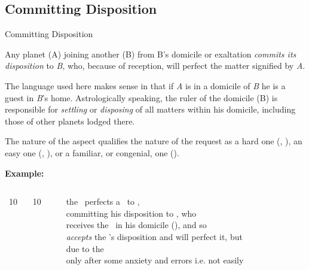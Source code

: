 \subsection{Committing Disposition}
\begin{frame}[t]{Committing Disposition}
\small
\begin{block}{}
Any planet (A) joining another (B) from B's domicile or exaltation \textsl{commits its disposition} to \textsl{B}, who, because of reception, will perfect the matter signified by \textsl{A}.
\end{block}

The language used here makes sense in that if \textsl{A} is in a domicile of \textsl{B} he is a guest in \textsl{B}'s home. Astrologically speaking, the ruler of the domicile (B) is responsible for \textsl{settling} or \textsl{disposing} of all matters within his domicile, including those of other planets lodged there.

The nature of the aspect qualifies the nature of the request as a hard one (\Square, \Opposition), an easy one (\Sextile, \Trine), or a familiar, or congenial, one (\Conjunction).

\textbf{Example:}
\begin{columns}[T, onlytextwidth]
\Sun\ 10 \Aries\ \Square\ \Mars\ 10 \Capricorn

\rule{.1mm}{.27\textheight}

the \Sun\ perfects a \Square\  to \Mars, \\
committing his disposition to \Mars, who  \\
receives the \Sun\ in his domicile (\Aries), and so \\
\textsl{accepts} the \Sun's disposition and will perfect it, but \\
due to the \Square\, \\ 
only after some anxiety and errors i.e. not easily
\end{columns}
\end{frame}
